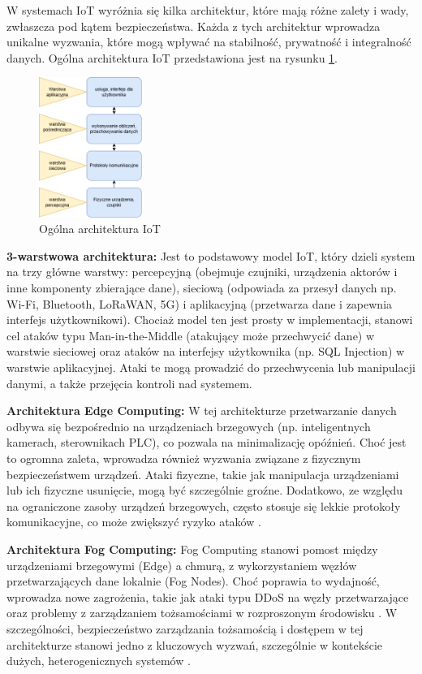 W systemach IoT wyróżnia się kilka architektur, które mają różne zalety i wady, zwłaszcza pod kątem bezpieczeństwa. Każda z tych architektur wprowadza unikalne wyzwania, które mogą wpływać na stabilność, prywatność i integralność danych. Ogólna architektura IoT przedstawiona jest na rysunku \ref{fig:Ogólna architektura IoT}.

\begin{figure}[h]
    \centering
    \includegraphics[width=0.3\textwidth]{pictures/IoTarch.drawio.png}
    \caption{Ogólna architektura IoT}
    \label{fig:Ogólna architektura IoT}
\end{figure}

\textbf{3-warstwowa architektura:}
Jest to podstawowy model IoT, który dzieli system na trzy główne warstwy: percepcyjną (obejmuje czujniki, urządzenia aktorów i inne komponenty zbierające dane), sieciową (odpowiada za przesył danych np. Wi-Fi, Bluetooth, LoRaWAN, 5G) i aplikacyjną (przetwarza dane i zapewnia interfejs użytkownikowi). Chociaż model ten jest prosty w implementacji, stanowi cel ataków typu Man-in-the-Middle (atakujący może przechwycić dane) w warstwie sieciowej oraz ataków na interfejsy użytkownika (np. SQL Injection) w warstwie aplikacyjnej. Ataki te mogą prowadzić do przechwycenia lub manipulacji danymi, a także przejęcia kontroli nad systemem.

\textbf{Architektura Edge Computing:}
W tej architekturze przetwarzanie danych odbywa się bezpośrednio na urządzeniach brzegowych (np. inteligentnych kamerach, sterownikach PLC), co pozwala na minimalizację opóźnień. Choć jest to ogromna zaleta, wprowadza również wyzwania związane z fizycznym bezpieczeństwem urządzeń. Ataki fizyczne, takie jak manipulacja urządzeniami lub ich fizyczne usunięcie, mogą być szczególnie groźne. Dodatkowo, ze względu na ograniczone zasoby urządzeń brzegowych, często stosuje się lekkie protokoły komunikacyjne, co może zwiększyć ryzyko ataków \cite{Lynn2020}.

\textbf{Architektura Fog Computing:}
Fog Computing stanowi pomost między urządzeniami brzegowymi (Edge) a chmurą, z wykorzystaniem węzłów przetwarzających dane lokalnie (Fog Nodes). Choć poprawia to wydajność, wprowadza nowe zagrożenia, takie jak ataki typu DDoS na węzły przetwarzające oraz problemy z zarządzaniem tożsamościami w rozproszonym środowisku \cite{Lynn2020}. W szczególności, bezpieczeństwo zarządzania tożsamością i dostępem w tej architekturze stanowi jedno z kluczowych wyzwań, szczególnie w kontekście dużych, heterogenicznych systemów \cite{OpenFog2018}.

